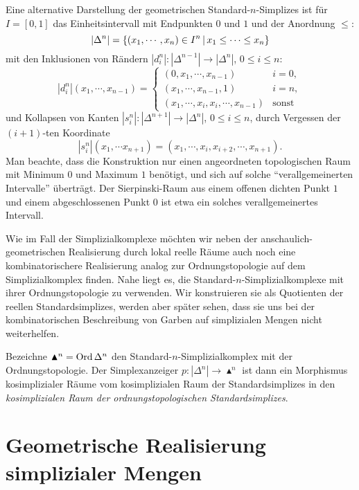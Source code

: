 \begin{bem} \label{gen-intervall}
  Eine alternative Darstellung der geometrischen
  Standard-$n$-Simplizes ist für $I = [0, 1]$ das Einheitsintervall
  mit Endpunkten $0$ und $1$ und der Anordnung $\leq$:
  \[ |\Delta^n| = \left\{ (x_1, \cdots, x_n) \in I^n \,\middle|\, x_1 \leq \cdots \leq x_n \right\} \]
  mit den Inklusionen von Rändern $|d_i^n|: |\Delta^{n-1}| \to
  |\Delta^n|$, $0 \leq i \leq n$:
  \[ |d_i^n|(x_1, \cdots, x_{n-1}) = 
  \begin{cases}
    (0, x_1, \cdots, x_{n-1}) & i = 0, \\ (x_1, \cdots, x_{n-1}, 1) &
    i = n, \\ (x_1, \cdots, x_i, x_i, \cdots, x_{n-1}) & \text{sonst}
  \end{cases}
  \]
  und Kollapsen von Kanten $|s_i^n|: |\Delta^{n+1}| \to |\Delta^{n}|$,
  $0 \leq i \leq n$, durch Vergessen der $(i+1)$-ten Koordinate
  \[ |s_i^n|(x_1, \cdots x_{n+1}) =
  (x_1, \cdots, x_i, x_{i+2}, \cdots, x_{n+1}).
  \]
  Man beachte, dass die Konstruktion nur einen angeordneten
  topologischen Raum mit Minimum $0$ und Maximum $1$ benötigt, und
  sich auf solche ``verallgemeinerten Intervalle'' überträgt. Der
  Sierpinski-Raum aus einem offenen dichten Punkt $1$ und einem
  abgeschlossenen Punkt $0$ ist etwa ein solches verallgemeinertes
  Intervall.
\end{bem}

\begin{bem} \label{clumsy-real}
  Wie im Fall der Simplizialkomplexe möchten wir neben der
  anschaulich-geometrischen Realisierung durch lokal reelle Räume auch
  noch eine kombinatorischere Realisierung analog zur
  Ordnungstopologie auf dem Simplizialkomplex finden. Nahe liegt es,
  die Standard-$n$-Simplizialkomplexe mit ihrer Ordnungstopologie zu
  verwenden. Wir konstruieren sie als Quotienten der reellen
  Standardsimplizes, werden aber später sehen, dass sie uns bei der
  kombinatorischen Beschreibung von Garben auf simplizialen Mengen
  nicht weiterhelfen.

  Bezeichne $\blacktriangle^n = \operatorname{Ord} \Delta^n$ den
  Standard-$n$-Simplizialkomplex mit der Ordnungstopologie. Der
  Simplexanzeiger $p: |\Delta^n| \to \blacktriangle^n$ ist dann ein
  Morphismus kosimplizialer Räume vom kosimplizialen Raum der
  Standardsimplizes in den \emph{kosimplizialen Raum der
    ordnungstopologischen Standardsimplizes}.
\end{bem}

\section[Geometrische Realisierung simplizialer Mengen]
        {\texorpdfstring{Geometrische Realisierung\\simplizialer Mengen}
          {Geometrische Realisierung simplizialer Mengen}
          }


